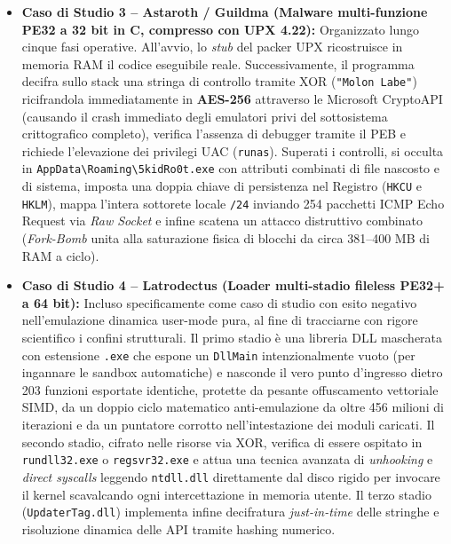 \documentclass[11pt, a4paper]{article}
\begin{document}
\begin{itemize}
	\item \textbf{Caso di Studio 3 -- Astaroth / Guildma (Malware multi-funzione PE32 a 32 bit in C, compresso con UPX 4.22):} Organizzato lungo cinque fasi operative. All'avvio, lo \textit{stub} del packer UPX ricostruisce in memoria RAM il codice eseguibile reale. Successivamente, il programma decifra sullo stack una stringa di controllo tramite XOR (\texttt{"Molon Labe"}) ricifrandola immediatamente in \textbf{AES-256} attraverso le Microsoft CryptoAPI (causando il crash immediato degli emulatori privi del sottosistema crittografico completo), verifica l'assenza di debugger tramite il PEB e richiede l'elevazione dei privilegi UAC (\texttt{runas}). Superati i controlli, si occulta in \texttt{App\allowbreak{}Data\textbackslash\allowbreak{}Roaming\textbackslash\allowbreak{}5kid\allowbreak{}Ro0t.\allowbreak{}exe} con attributi combinati di file nascosto e di sistema, imposta una doppia chiave di persistenza nel Registro (\texttt{HKCU} e \texttt{HKLM}), mappa l'intera sottorete locale \texttt{/24} inviando 254 pacchetti ICMP Echo Request via \textit{Raw Socket} e infine scatena un attacco distruttivo combinato (\textit{Fork-Bomb} unita alla saturazione fisica di blocchi da circa 381--400 MB di RAM a ciclo).
	
	\item \textbf{Caso di Studio 4 -- Latrodectus (Loader multi-stadio fileless PE32+ a 64 bit):} Incluso specificamente come caso di studio con esito negativo nell'emulazione dinamica user-mode pura, al fine di tracciarne con rigore scientifico i confini strutturali. Il primo stadio \`e una libreria DLL mascherata con estensione \texttt{.exe} che espone un \texttt{DllMain} intenzionalmente vuoto (per ingannare le sandbox automatiche) e nasconde il vero punto d'ingresso dietro 203 funzioni esportate identiche, protette da pesante offuscamento vettoriale SIMD, da un doppio ciclo matematico anti-emulazione da oltre 456 milioni di iterazioni e da un puntatore corrotto nell'intestazione dei moduli caricati. Il secondo stadio, cifrato nelle risorse via XOR, verifica di essere ospitato in \texttt{rundll32.exe} o \texttt{regsvr32.exe} e attua una tecnica avanzata di \textit{unhooking} e \textit{direct syscalls} leggendo \texttt{ntdll.dll} direttamente dal disco rigido per invocare il kernel scavalcando ogni intercettazione in memoria utente. Il terzo stadio (\texttt{Updater\allowbreak{}Tag.\allowbreak{}dll}) implementa infine decifratura \textit{just-in-time} delle stringhe e risoluzione dinamica delle API tramite hashing numerico.
\end{itemize}
\end{document}
